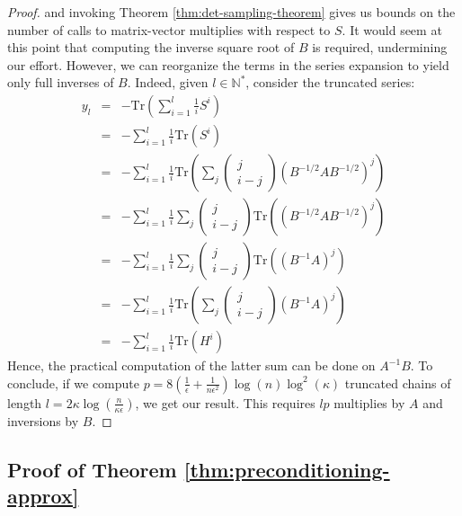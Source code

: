 \begin{proof}
and invoking Theorem \ref{thm:det-sampling-theorem} gives us bounds
on the number of calls to matrix-vector multiplies with respect to
$S$. It would seem at this point that computing the inverse square
root of $B$ is required, undermining our effort. However, we can
reorganize the terms in the series expansion to yield only full inverses
of $B$. Indeed, given $l\in\mathbb{N}^{*}$, consider the truncated
series: 
\begin{eqnarray*}
y_{l} & = & -\mbox{Tr}\left(\sum_{i=1}^{l}\frac{1}{i}S^{i}\right)\\
 & = & -\sum_{i=1}^{l}\frac{1}{i}\mbox{Tr}\left(S^{i}\right)\\
 & = & -\sum_{i=1}^{l}\frac{1}{i}\mbox{Tr}\left(\sum_{j}\left(\begin{array}{c}
j\\
i-j
\end{array}\right)\left(B^{-1/2}AB^{-1/2}\right)^{j}\right)\\
 & = & -\sum_{i=1}^{l}\frac{1}{i}\sum_{j}\left(\begin{array}{c}
j\\
i-j
\end{array}\right)\mbox{Tr}\left(\left(B^{-1/2}AB^{-1/2}\right)^{j}\right)\\
 & = & -\sum_{i=1}^{l}\frac{1}{i}\sum_{j}\left(\begin{array}{c}
j\\
i-j
\end{array}\right)\mbox{Tr}\left(\left(B^{-1}A\right)^{j}\right)\\
 & = & -\sum_{i=1}^{l}\frac{1}{i}\mbox{Tr}\left(\sum_{j}\left(\begin{array}{c}
j\\
i-j
\end{array}\right)\left(B^{-1}A\right)^{j}\right)\\
 & = & -\sum_{i=1}^{l}\frac{1}{i}\mbox{Tr}\left(H^{i}\right)
\end{eqnarray*}
Hence, the practical computation of the latter sum can be done on
$A^{-1}B$. To conclude, if we compute $p=8\left(\frac{1}{\epsilon}+\frac{1}{n\epsilon^{2}}\right)\log\left(n\right)\log^{2}\left(\kappa\right)$
truncated chains of length $l=2\kappa\log\left(\frac{n}{\kappa\epsilon}\right)$,
we get our result. This requires $lp$ multiplies by $A$ and inversions
by $B$. \end{proof} 


\subsection{Proof of Theorem \ref{thm:preconditioning-approx}}


